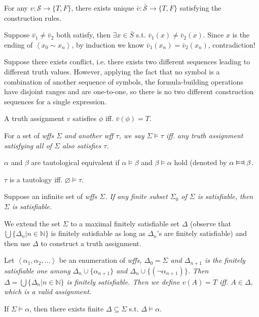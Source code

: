 \documentclass{article}
\newcommand \mlist[1]				{\left\langle #1 \right\rangle}
\newcommand \logeq					{\vDash\mathrel{\text{\reflectbox{$\vDash$}}}}
\begin{document}
\Thm {}
	For any $v:\mathcal{S}\to\{T,F\}$, there exists unique $\bar{v}:\bar{\mathcal{S}}\to\{T,F\}$ satisfying the construction rules.
	
\Proof Suppose $\bar{v}_1 \ne \bar{v}_2$ both satisfy, then $\exists x \in \bar{S}$ s.t. $\bar{v}_1(x) \ne \bar{v}_2(x)$. Since $x$ is the ending of $\mlist{x_0\sim x_n}$, by induction we know $\bar{v}_1(x_n)=\bar{v}_2(x_n)$, contradiction!

Suppose there exists conflict, i.e. there exists two different sequences leading to different truth values. However, applying the fact that no symbol is a combination of another sequence of symbols, the formula-building operations have disjoint ranges and are one-to-one, so there is no two different construction sequences for a single expression.
	
	A truth assignment $v$ satisfies $\phi$ iff. $\bar{v}(\phi)=T$.

	For a set of \it{wff}s $\Sigma$ and another \it{wff} $\tau$, we say $\Sigma \vDash \tau$ iff. any truth assignment satisfying all of $\Sigma$ also satisfies $\tau$.
	
	$\alpha$ and $\beta$ are tautological equivalent if $\alpha \vDash \beta$ and $\beta \vDash \alpha$ hold (denoted by $\alpha \logeq \beta$.

	$\tau$ is a tautology iff. $\varnothing \vDash \tau$.

	Suppose an infinite set of \it{wff}s $\Sigma$. If any finite subset $\Sigma_0$ of $\Sigma$ is satisfiable, then $\Sigma$ is satisfiable.
	
\Proof
	We extend the set $\Sigma$ to a maximal finitely satisfiable set $\Delta$ (observe that $\bigcup \{\Delta_n|n \in \mathbb{N}\}$ is finitely satisfiable as long as $\Delta_n$'s are finitely satisfiable) and then use $\Delta$ to construct a truth assignment.
	
	Let $\mlist{\alpha_1, \alpha_2,...}$ be an enumeration of \it{wff}s, $\Delta_0=\Sigma$ and $\Delta_{n+1}$ is the finitely satisfiable one among $\Delta_n \cup \{\alpha_{n+1}\}$ and $\Delta_n \cup \{(\neg\alpha_{n+1})\}$. Then $\Delta=\bigcup \{\Delta_n|n \in \mathbb{N}\}$ is finitely satisfiable. Then we define $v(A)=T$ iff. $A\in\Delta$, which is a valid assignment.
	
\Thm {}
	If $\Sigma \vDash \alpha$, then there exists finite $\Delta \subseteq \Sigma$ s.t. $\Delta \vDash \alpha$.
\end{document}
